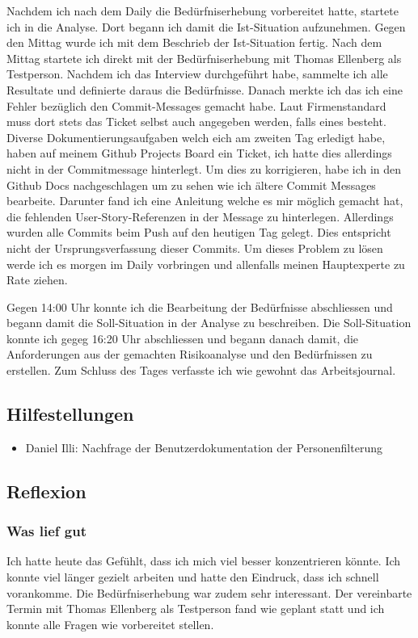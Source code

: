 Nachdem ich nach dem Daily die Bedürfniserhebung vorbereitet hatte,
startete ich in die Analyse. Dort begann ich damit die Ist-Situation aufzunehmen. Gegen den Mittag wurde ich mit dem Beschrieb der 
Ist-Situation fertig. Nach dem Mittag startete ich direkt mit der Bedürfniserhebung mit Thomas Ellenberg als Testperson. Nachdem ich das Interview 
durchgeführt habe, sammelte ich alle Resultate und definierte daraus die Bedürfnisse. Danach merkte ich das ich eine Fehler bezüglich den Commit-Messages gemacht habe.
Laut Firmenstandard muss dort stets das Ticket selbst auch angegeben werden, falls eines besteht. Diverse Dokumentierungsaufgaben welch eich am zweiten Tag erledigt habe,
haben auf meinem Github Projects Board ein Ticket, ich hatte dies allerdings nicht in der Commitmessage hinterlegt. Um dies zu korrigieren, habe ich in den Github Docs nachgeschlagen
um zu sehen wie ich ältere Commit Messages bearbeite. Darunter fand ich eine Anleitung welche es mir möglich gemacht hat, die fehlenden User-Story-Referenzen in der 
Message zu hinterlegen. Allerdings wurden alle Commits beim Push auf den heutigen Tag gelegt. Dies entspricht nicht der Ursprungsverfassung dieser Commits.
Um dieses Problem zu lösen werde ich es morgen im Daily vorbringen und allenfalls meinen Hauptexperte zu Rate ziehen.

Gegen 14:00 Uhr konnte ich die Bearbeitung der Bedürfnisse
abschliessen und begann damit die Soll-Situation in der Analyse zu beschreiben. Die Soll-Situation konnte ich gegeg 16:20 Uhr abschliessen und begann danach damit,
die Anforderungen aus der gemachten Risikoanalyse und den Bedürfnissen zu erstellen. Zum Schluss des Tages verfasste ich wie gewohnt das Arbeitsjournal.

\subsection*{Hilfestellungen}
\begin{itemize}
    \item Daniel Illi: Nachfrage der Benutzerdokumentation der Personenfilterung
\end{itemize}

\subsection*{Reflexion}

\subsubsection*{Was lief gut}
Ich hatte heute das Gefühlt, dass ich mich viel besser konzentrieren könnte. Ich konnte viel länger gezielt arbeiten
und hatte den Eindruck, dass ich schnell vorankomme. Die Bedürfniserhebung war zudem sehr interessant. Der vereinbarte Termin
mit Thomas Ellenberg als Testperson fand wie geplant statt und ich konnte alle Fragen wie vorbereitet stellen.


